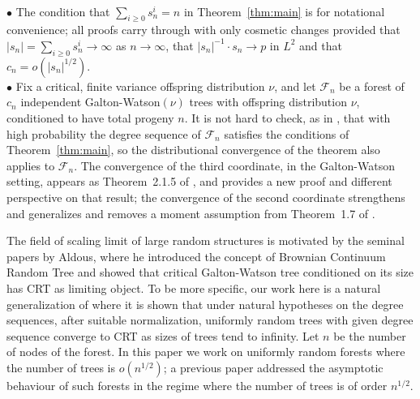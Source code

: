  \\
$\bullet$ The condition that $\sum_{i \ge 0} s_n^i = n$ in Theorem~\ref{thm:main} is for notational convenience; all proofs carry through with only cosmetic changes provided that $|s_n| = \sum_{i \ge 0} s_n^i \to \infty$ as $n \to \infty$, that $|s_n|^{-1}\cdot s_n \to p$ in $L^2$ and that $c_n = o(|s_n|^{1/2})$. \\
$\bullet$ Fix a critical, finite variance offspring distribution $\nu$, and let $\mathcal{F}_n$ be a forest of $c_n$ independent Galton-Watson$(\nu)$ trees with offspring distribution $\nu$, conditioned to have total progeny $n$. It is not hard to check, as in \cite{BroutinMarckert2014}, that with high probability the degree sequence of $\mathcal{F}_n$ satisfies the conditions of Theorem~\ref{thm:main}, so the distributional convergence of the theorem also applies to $\mathcal{F}_n$. The convergence of the third coordinate, in the Galton-Watson setting, appears as Theorem~2.1.5 of \cite{Pavlov2000}, and provides a new proof and different perspective on that result; the convergence of the second coordinate strengthens and generalizes and removes a moment assumption from Theorem~1.7 of \cite{Cheplyukova1998}. 

\medskip 

The field of scaling limit of large random structures is motivated by the seminal papers \cite{AldousI, AldousII, AldousIII} by Aldous, where he introduced the concept of Brownian Continuum Random Tree and showed that critical Galton-Watson tree conditioned on its size has CRT as limiting object. To be more specific, our work here is a natural generalization of \cite{BroutinMarckert2014} where it is shown that under natural hypotheses on the degree sequences, after suitable normalization, uniformly random trees with given degree sequence converge to CRT as sizes of trees tend to infinity. Let $n$ be the number of nodes of the forest. In this paper we work on uniformly random forests where the number of trees is $o(n^{1/2})$; a previous paper \cite{Lei2017+} addressed the asymptotic behaviour of such forests in the regime where the number of trees is of order $n^{1/2}$. 

